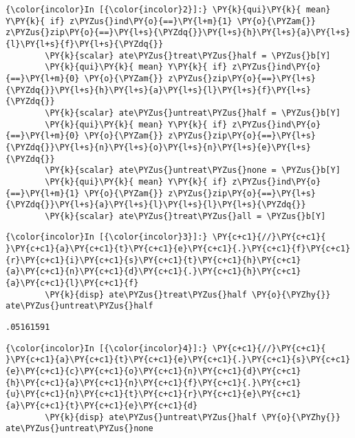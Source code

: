 \documentclass[11pt,notitlepage]{article}\usepackage[]{graphicx}\usepackage[]{color}
\makeatletter
\newenvironment{kframe}{%
 \def\at@end@of@kframe{}%
 \ifinner\ifhmode%
  \def\at@end@of@kframe{\end{minipage}}%
  \begin{minipage}{\columnwidth}%
 \fi\fi%
 \def\FrameCommand##1{\hskip\@totalleftmargin \hskip-\fboxsep
 \colorbox{shadecolor}{##1}\hskip-\fboxsep
     \hskip-\linewidth \hskip-\@totalleftmargin \hskip\columnwidth}%
 \MakeFramed {\advance\hsize-\width
   \@totalleftmargin\z@ \linewidth\hsize
   \@setminipage}}%
 {\par\unskip\endMakeFramed%
 \at@end@of@kframe}
\newenvironment{knitrout}{}{} %
\makeatother
\begin{document}
\begin{enumerate}[a)]
\begin{knitrout}
\begin{kframe}
    \begin{Verbatim}[commandchars=\\\{\}]
{\color{incolor}In [{\color{incolor}2}]:} \PY{k}{qui}\PY{k}{ mean} Y\PY{k}{ if} z\PYZus{}ind\PY{o}{==}\PY{l+m}{1} \PY{o}{\PYZam{}} z\PYZus{}zip\PY{o}{==}\PY{l+s}{\PYZdq{}}\PY{l+s}{h}\PY{l+s}{a}\PY{l+s}{l}\PY{l+s}{f}\PY{l+s}{\PYZdq{}}
        \PY{k}{scalar} ate\PYZus{}treat\PYZus{}half = \PYZus{}b[Y]
        \PY{k}{qui}\PY{k}{ mean} Y\PY{k}{ if} z\PYZus{}ind\PY{o}{==}\PY{l+m}{0} \PY{o}{\PYZam{}} z\PYZus{}zip\PY{o}{==}\PY{l+s}{\PYZdq{}}\PY{l+s}{h}\PY{l+s}{a}\PY{l+s}{l}\PY{l+s}{f}\PY{l+s}{\PYZdq{}}
        \PY{k}{scalar} ate\PYZus{}untreat\PYZus{}half = \PYZus{}b[Y]
        \PY{k}{qui}\PY{k}{ mean} Y\PY{k}{ if} z\PYZus{}ind\PY{o}{==}\PY{l+m}{0} \PY{o}{\PYZam{}} z\PYZus{}zip\PY{o}{==}\PY{l+s}{\PYZdq{}}\PY{l+s}{n}\PY{l+s}{o}\PY{l+s}{n}\PY{l+s}{e}\PY{l+s}{\PYZdq{}}
        \PY{k}{scalar} ate\PYZus{}untreat\PYZus{}none = \PYZus{}b[Y]
        \PY{k}{qui}\PY{k}{ mean} Y\PY{k}{ if} z\PYZus{}ind\PY{o}{==}\PY{l+m}{1} \PY{o}{\PYZam{}} z\PYZus{}zip\PY{o}{==}\PY{l+s}{\PYZdq{}}\PY{l+s}{a}\PY{l+s}{l}\PY{l+s}{l}\PY{l+s}{\PYZdq{}}
        \PY{k}{scalar} ate\PYZus{}treat\PYZus{}all = \PYZus{}b[Y]
\end{Verbatim}

    \begin{Verbatim}[commandchars=\\\{\}]
{\color{incolor}In [{\color{incolor}3}]:} \PY{c+c1}{//}\PY{c+c1}{ }\PY{c+c1}{a}\PY{c+c1}{t}\PY{c+c1}{e}\PY{c+c1}{.}\PY{c+c1}{f}\PY{c+c1}{r}\PY{c+c1}{i}\PY{c+c1}{s}\PY{c+c1}{t}\PY{c+c1}{h}\PY{c+c1}{a}\PY{c+c1}{n}\PY{c+c1}{d}\PY{c+c1}{.}\PY{c+c1}{h}\PY{c+c1}{a}\PY{c+c1}{l}\PY{c+c1}{f}
        \PY{k}{disp} ate\PYZus{}treat\PYZus{}half \PY{o}{\PYZhy{}} ate\PYZus{}untreat\PYZus{}half
\end{Verbatim}

    \begin{Verbatim}[commandchars=\\\{\}]
.05161591

    \end{Verbatim}

    \begin{Verbatim}[commandchars=\\\{\}]
{\color{incolor}In [{\color{incolor}4}]:} \PY{c+c1}{//}\PY{c+c1}{ }\PY{c+c1}{a}\PY{c+c1}{t}\PY{c+c1}{e}\PY{c+c1}{.}\PY{c+c1}{s}\PY{c+c1}{e}\PY{c+c1}{c}\PY{c+c1}{o}\PY{c+c1}{n}\PY{c+c1}{d}\PY{c+c1}{h}\PY{c+c1}{a}\PY{c+c1}{n}\PY{c+c1}{f}\PY{c+c1}{.}\PY{c+c1}{u}\PY{c+c1}{n}\PY{c+c1}{t}\PY{c+c1}{r}\PY{c+c1}{e}\PY{c+c1}{a}\PY{c+c1}{t}\PY{c+c1}{e}\PY{c+c1}{d}
        \PY{k}{disp} ate\PYZus{}untreat\PYZus{}half \PY{o}{\PYZhy{}} ate\PYZus{}untreat\PYZus{}none
\end{Verbatim}


\end{kframe}
\end{knitrout}
\end{enumerate}
\end{document}
